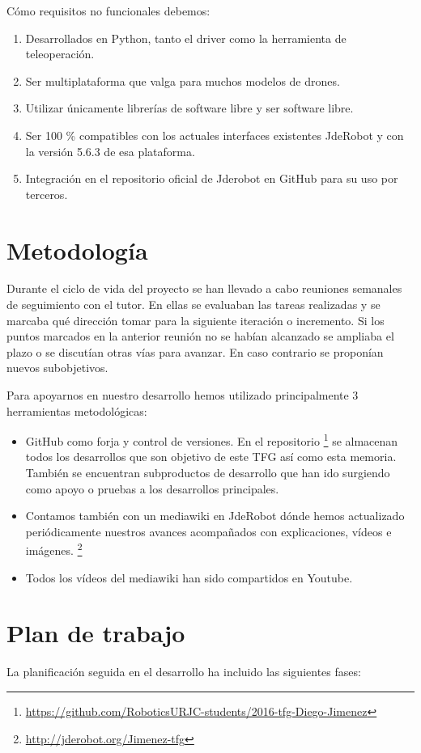 Cómo requisitos no funcionales debemos:

\begin{enumerate}
\item Desarrollados en Python, tanto el driver como la herramienta de teleoperación.
\item Ser multiplataforma que valga para muchos modelos de drones.
\item Utilizar únicamente librerías de software libre y ser software libre.
\item Ser 100 \% compatibles con los actuales interfaces existentes JdeRobot y con la versión 5.6.3 de esa plataforma.
\item Integración en el repositorio oficial de Jderobot en GitHub para su uso por terceros.

\end{enumerate}

\section{Metodología}

Durante el ciclo de vida del proyecto se han llevado a cabo reuniones semanales de seguimiento con el tutor. En ellas se evaluaban las tareas realizadas y se marcaba qué dirección tomar para la siguiente iteración o incremento. Si los puntos marcados en la anterior reunión no se habían alcanzado se ampliaba el plazo o se discutían otras vías para avanzar. En caso contrario se proponían nuevos subobjetivos.

Para apoyarnos en nuestro desarrollo hemos utilizado principalmente 3 herramientas metodológicas:
\begin{itemize}
\item GitHub como forja y control de versiones. En el repositorio \footnote{\url{https://github.com/RoboticsURJC-students/2016-tfg-Diego-Jimenez}}
se almacenan todos los desarrollos que son objetivo de este TFG así como esta memoria. También se encuentran subproductos de desarrollo que han ido surgiendo como apoyo o pruebas a los desarrollos principales.
\item Contamos también con un mediawiki en JdeRobot dónde hemos actualizado periódicamente nuestros avances acompañados con explicaciones, vídeos e imágenes. \footnote{\url{http://jderobot.org/Jimenez-tfg}}
\item Todos los vídeos del mediawiki han sido compartidos en Youtube.
\end{itemize}

\section{Plan de trabajo}
La planificación seguida en el desarrollo ha incluido las siguientes fases:

